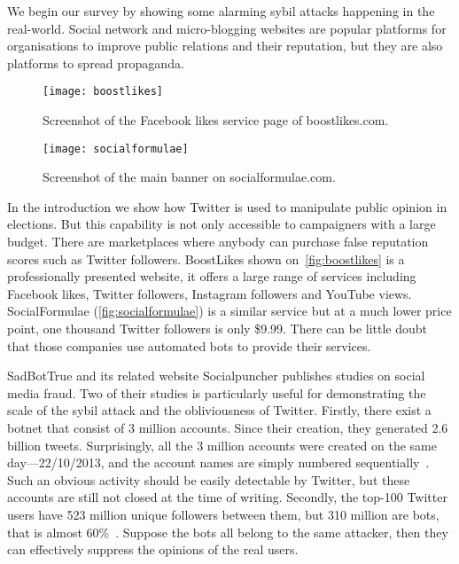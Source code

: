 We begin our survey by showing some alarming sybil attacks happening in the
real-world. Social network and micro-blogging websites are popular platforms for
organisations to improve public relations and their reputation, but they are
also platforms to spread propaganda. 

\begin{figure}
  \centering
  \texttt{[image: boostlikes]}
  \caption{Screenshot of the Facebook likes service page of boostlikes.com.}
  \label{fig:boostlikes}
\end{figure}

\begin{figure*}
  \centering
  \texttt{[image: socialformulae]}
  \caption{Screenshot of the main banner on socialformulae.com.}
  \label{fig:socialformulae}
\end{figure*}

In the introduction we show how Twitter is used to manipulate public opinion in
elections. But this capability is not only accessible to campaigners with a
large budget. There are marketplaces where anybody can purchase false reputation
scores such as Twitter followers. BoostLikes shown on~\autoref{fig:boostlikes}
is a professionally presented website, it offers a large range of services
including Facebook likes, Twitter followers, Instagram followers and YouTube
views. SocialFormulae (\autoref{fig:socialformulae}) is a similar service but at
a much lower price point, one thousand Twitter followers is only \$9.99. There
can be little doubt that those companies use automated bots to provide their
services.

SadBotTrue and its related website Socialpuncher publishes studies on social
media fraud. Two of their studies is particularly useful for demonstrating the
scale of the sybil attack and the obliviousness of Twitter. Firstly, there exist
a botnet that consist of 3 million accounts. Since their creation, they
generated 2.6 billion tweets. Surprisingly, all the 3 million accounts were
created on the same day---22/10/2013, and the account names are simply numbered
sequentially~\cite{sadbottrue}. Such an obvious activity should be easily
detectable by Twitter, but these accounts are still not closed at the time of
writing. Secondly, the top-100 Twitter users have 523 million unique followers
between them, but 310 million are bots, that is almost 60\%~\cite{socialpuncher}.
Suppose the bots all belong to the same attacker, then they can effectively
suppress the opinions of the real users.

